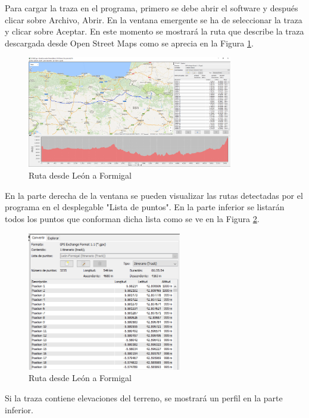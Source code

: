 Para cargar la traza en el programa, primero se debe abrir el software y después clicar sobre Archivo, Abrir. En la ventana emergente se ha de seleccionar la traza y clicar sobre Aceptar. En este momento se mostrará la ruta que describe la traza descargada desde Open Street Maps como se aprecia en la Figura \ref{rutaLeonFormigal}.

\begin{figure}[h]
  \centering
    \includegraphics[width=0.8\textwidth]{../img/routeconverter/analisis_traza.png}
  \caption{Ruta desde León a Formigal}
  \label{rutaLeonFormigal}
\end{figure}

En la parte derecha de la ventana se pueden visualizar las rutas detectadas por el programa en el desplegable "Lista de puntos". En la parte inferior se listarán todos los puntos que conforman dicha lista como se ve en la Figura \ref{puntosGeograficos}.

\begin{figure}[h]
  \centering
    \includegraphics[width=0.6\textwidth]{../img/routeconverter/datos_traza.png}
  \caption{Ruta desde León a Formigal}
  \label{puntosGeograficos}
\end{figure}

Si la traza contiene elevaciones del terreno, se mostrará un perfil en la parte inferior.

